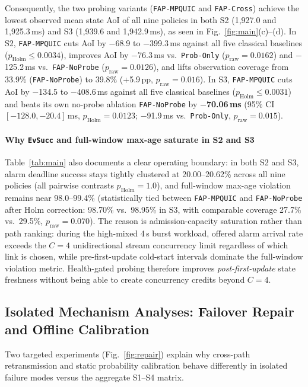 \documentclass[preprint,12pt,number]{elsarticle}
\begin{document}
Consequently, the two probing variants (\texttt{FAP-MPQUIC} and \texttt{FAP-Cross}) achieve the lowest observed mean state AoI of all nine policies in both S2 (1,927.0 and 1,925.3\,ms) and S3 (1,939.6 and 1,942.9\,ms), as seen in Fig.~\ref{fig:main}(c)--(d). In S2, \texttt{FAP-MPQUIC} cuts AoI by $-$68.9 to $-$399.3\,ms against all five classical baselines ($p_{\text{Holm}} \le 0.0034$), improves AoI by $-$76.3\,ms vs.\ \texttt{Prob-Only} ($p_{\text{raw}} = 0.0162$) and $-$125.2\,ms vs.\ \texttt{FAP-NoProbe} ($p_{\text{raw}} = 0.0126$), and lifts observation coverage from 33.9\% (\texttt{FAP-NoProbe}) to 39.8\% (+5.9\,pp, $p_{\text{raw}} = 0.016$). In S3, \texttt{FAP-MPQUIC} cuts AoI by $-$134.5 to $-$408.6\,ms against all five classical baselines ($p_{\text{Holm}} \le 0.0031$) and beats its own no-probe ablation \texttt{FAP-NoProbe} by \textbf{$-$70.06\,ms} (95\% CI $[-128.0, -20.4]$\,ms, $p_{\text{Holm}} = 0.0123$; $-$91.9\,ms vs.\ \texttt{Prob-Only}, $p_{\text{raw}} = 0.015$).

\paragraph{Why \texttt{EvSucc} and full-window max-age saturate in S2 and S3}
Table~\ref{tab:main} also documents a clear operating boundary: in both S2 and S3, alarm deadline success stays tightly clustered at 20.00--20.62\% across all nine policies (all pairwise contrasts $p_{\text{Holm}} = 1.0$), and full-window max-age violation remains near 98.0--99.4\% (statistically tied between \texttt{FAP-MPQUIC} and \texttt{FAP-NoProbe} after Holm correction: 98.70\% vs.\ 98.95\% in S3, with comparable coverage 27.7\% vs.\ 29.5\%, $p_{\text{raw}} = 0.070$). The reason is admission-capacity saturation rather than path ranking: during the high-mixed 4\,s burst workload, offered alarm arrival rate exceeds the $C{=}4$ unidirectional stream concurrency limit regardless of which link is chosen, while pre-first-update cold-start intervals dominate the full-window violation metric. Health-gated probing therefore improves \emph{post-first-update} state freshness without being able to create concurrency credits beyond $C{=}4$.

\subsection{Isolated Mechanism Analyses: Failover Repair and Offline Calibration}
\label{sec:mech}

Two targeted experiments (Fig.~\ref{fig:repair}) explain why cross-path retransmission and static probability calibration behave differently in isolated failure modes versus the aggregate S1--S4 matrix.
\end{document}
